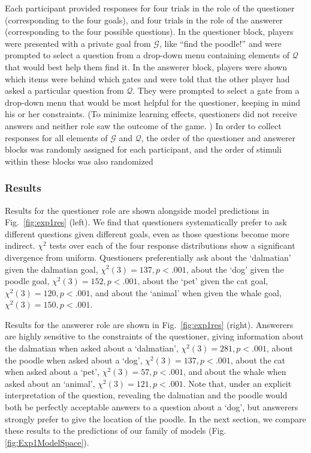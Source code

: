 \documentclass[12pt, floatsintext, man]{apa6}
\begin{document}
Each participant provided responses for four trials in the role of the questioner (corresponding to the four goals), and four trials in the role of the answerer (corresponding to the four possible questions). In the questioner block, players were presented with a private goal from $\mathcal{G}$, like ``find the poodle!'' and were prompted to select a question from a drop-down menu containing elements of $\mathcal{Q}$ that would best help them find it. In the answerer block, players were shown which items were behind which gates and were told that the other player had asked a particular question from $\mathcal{Q}$. They were prompted to select a gate from a drop-down menu that would be most helpful for the questioner, keeping in mind his or her constraints. 
(To minimize learning effects, questioners did not receive answers and neither role saw the outcome of the game.%
)
In order to collect responses for all elements of $\mathcal{G}$ and $\mathcal{Q}$, the order of the questioner and answerer blocks was randomly assigned for each participant, and the order of stimuli within these blocks was also randomized%

\subsubsection{Results}
Results for the questioner role are shown alongside model predictions in Fig.~\ref{fig:exp1res} (left). We find that questioners systematically prefer to ask different questions given different goals, even as those questions become more indirect. $\chi^2$ tests over each of the four response distributions show a significant divergence from uniform. Questioners preferentially ask about the `dalmatian' given the  dalmatian goal, ${\chi^2(3) = 137}, {p < .001}$, about the `dog' given the poodle goal, ${\chi^2(3) = 152}, {p <.001}$, about the `pet' given the cat goal, ${\chi^2(3) = 120},  {p <.001}$, and about the `animal' when given the whale goal, ${\chi^2(3) = 150}, {p <.001}$. 

Results for the answerer role are shown in Fig.~\ref{fig:exp1res} (right). Answerers are highly sensitive to the constraints of the questioner, giving information about the dalmatian when asked about a `dalmatian', ${\chi^2(3) = 281}, {p <.001}$, about the poodle when asked about a `dog', ${\chi^2(3) = 137}, {p <.001}$, about the cat when asked about a `pet', ${\chi^2(3) = 57}, {p<.001}$, and about the whale when asked about an `animal', ${\chi^2(3) = 121}, {p < .001}$. Note that, under an explicit interpretation of the question, revealing the dalmatian and the poodle would both be perfectly acceptable answers to a question about a `dog', but answerers strongly prefer to give the location of the poodle.  In the next section, we compare these results to the predictions of our family of models (Fig. \ref{fig:Exp1ModelSpace}). 
\end{document}
